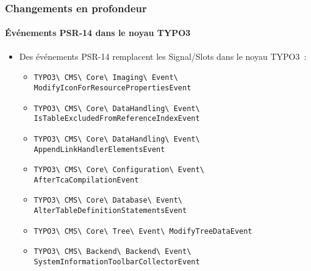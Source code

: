 \begin{frame}[fragile]
	\frametitle{Changements en profondeur}
	\framesubtitle{Événements PSR-14 dans le noyau TYPO3}

	\begin{itemize}
		\item Des événements PSR-14 remplacent les Signal/Slots dans le noyau TYPO3~:
			\newline

			\begin{itemize}\tiny
				\item \texttt{TYPO3\textbackslash
					CMS\textbackslash
					Core\textbackslash
					Imaging\textbackslash
					Event\textbackslash
					ModifyIconForResourcePropertiesEvent}
					\newline
				\item \texttt{TYPO3\textbackslash
					CMS\textbackslash
					Core\textbackslash
					DataHandling\textbackslash
					Event\textbackslash
					IsTableExcludedFromReferenceIndexEvent}
					\newline
				\item \texttt{TYPO3\textbackslash
					CMS\textbackslash
					Core\textbackslash
					DataHandling\textbackslash
					Event\textbackslash
					AppendLinkHandlerElementsEvent}
					\newline
				\item \texttt{TYPO3\textbackslash
					CMS\textbackslash
					Core\textbackslash
					Configuration\textbackslash
					Event\textbackslash
					AfterTcaCompilationEvent}
					\newline
				\item \texttt{TYPO3\textbackslash
					CMS\textbackslash
					Core\textbackslash
					Database\textbackslash
					Event\textbackslash
					AlterTableDefinitionStatementsEvent}
					\newline
				\item \texttt{TYPO3\textbackslash
					CMS\textbackslash
					Core\textbackslash
					Tree\textbackslash
					Event\textbackslash
					ModifyTreeDataEvent}
					\newline
				\item \texttt{TYPO3\textbackslash
					CMS\textbackslash
					Backend\textbackslash
					Backend\textbackslash
					Event\textbackslash
					SystemInformationToolbarCollectorEvent}
					\newline
			\end{itemize}

	\end{itemize}

\end{frame}

